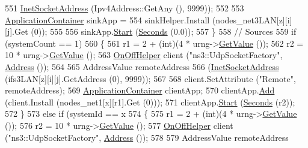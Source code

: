 \begin{DoxyCode}
551                         \hyperlink{classns3_1_1InetSocketAddress}{InetSocketAddress} (Ipv4Address::GetAny (), 9999));
552 
553                       \hyperlink{classns3_1_1ApplicationContainer}{ApplicationContainer} sinkApp =
554                         sinkHelper.Install (nodes\_net3LAN[z][i][j].Get (0));
555 
556                       sinkApp.\hyperlink{classns3_1_1ApplicationContainer_a8eff87926507020bbe3e1390358a54a7}{Start} (\hyperlink{group__timecivil_ga33c34b816f8ff6628e33d5c8e9713b9e}{Seconds} (0.0));
557                     \}
558                   \textcolor{comment}{// Sources}
559                   \textcolor{keywordflow}{if} (systemCount == 1)
560                     \{
561                       r1 = 2 + (int)(4 * urng->\hyperlink{classns3_1_1UniformRandomVariable_a03822d8c86ac51e9aa83bbc73041386b}{GetValue} ());
562                       r2 = 10 * urng->\hyperlink{classns3_1_1UniformRandomVariable_a03822d8c86ac51e9aa83bbc73041386b}{GetValue} ();
563                       \hyperlink{classns3_1_1OnOffHelper}{OnOffHelper} client (\textcolor{stringliteral}{"ns3::UdpSocketFactory"}, 
      \hyperlink{classns3_1_1Address}{Address} ());
564 
565                       AddressValue remoteAddress
566                         (\hyperlink{classns3_1_1InetSocketAddress}{InetSocketAddress} (ifs3LAN[z][i][j].GetAddress (0), 9999));
567 
568                       client.SetAttribute (\textcolor{stringliteral}{"Remote"}, remoteAddress);
569                       \hyperlink{classns3_1_1ApplicationContainer}{ApplicationContainer} clientApp;
570                       clientApp.\hyperlink{classns3_1_1ApplicationContainer_ad09ab1a1ad5849d518d5f4c262e38152}{Add} (client.Install (nodes\_net1[x][r1].Get (0)));
571                       clientApp.\hyperlink{classns3_1_1ApplicationContainer_a8eff87926507020bbe3e1390358a54a7}{Start} (\hyperlink{group__timecivil_ga33c34b816f8ff6628e33d5c8e9713b9e}{Seconds} (r2));
572                     \}
573                   \textcolor{keywordflow}{else} \textcolor{keywordflow}{if} (systemId == x %
574                     \{
575                       r1 = 2 + (int)(4 * urng->\hyperlink{classns3_1_1UniformRandomVariable_a03822d8c86ac51e9aa83bbc73041386b}{GetValue} ());
576                       r2 = 10 * urng->\hyperlink{classns3_1_1UniformRandomVariable_a03822d8c86ac51e9aa83bbc73041386b}{GetValue} ();
577                       \hyperlink{classns3_1_1OnOffHelper}{OnOffHelper} client (\textcolor{stringliteral}{"ns3::UdpSocketFactory"}, 
      \hyperlink{classns3_1_1Address}{Address} ());
578 
579                       AddressValue remoteAddress

\end{DoxyCode}
